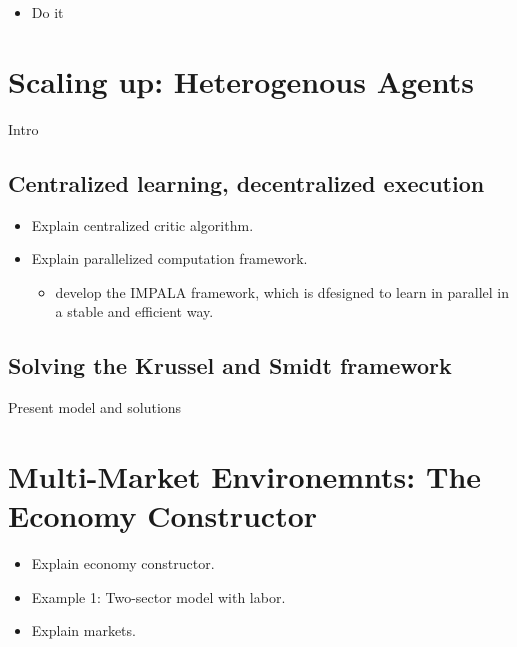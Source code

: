 \documentclass[11pt,english]{article}
\begin{document}
\begin{itemize}
	\item Do it
\end{itemize}

\section{Scaling up: Heterogenous Agents}

Intro

\subsection{Centralized learning, decentralized execution}
\begin{itemize}
	\item Explain centralized critic algorithm.
	\item Explain parallelized computation framework.
	\begin{itemize}
		\item \citet{espeholt2018} develop the IMPALA framework, which is dfesigned
		to learn in parallel in a stable and efficient way.
	\end{itemize}
\end{itemize}

\subsection{Solving the Krussel and Smidt framework}

Present model and solutions

\section{Multi-Market Environemnts: The Economy Constructor}
\begin{itemize}
\item Explain economy constructor.
\item Example 1: Two-sector model with labor.
\item Explain markets.
\end{itemize}





\end{document}
